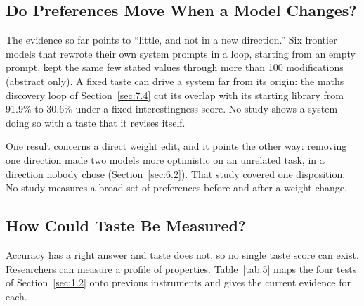 \documentclass[journal]{IEEEtran}
\begin{document}
\subsection{Do Preferences Move When a Model Changes?}\label{sec:8.4}

The evidence so far points to ``little, and not in a new direction.'' Six frontier models that rewrote their own system prompts in a loop, starting from an empty prompt, kept the same few stated values through more than 100 modifications~\cite{Stroganov2026} (abstract only). A fixed taste can drive a system far from its origin: the maths discovery loop of Section~\ref{sec:7.4} cut its overlap with its starting library from 91.9\% to 30.6\% under a fixed interestingness score. No study shows a system doing so with a taste that it revises itself.

One result concerns a direct weight edit, and it points the other way: removing one direction made two models more optimistic on an unrelated task, in a direction nobody chose (Section~\ref{sec:6.2}). That study covered one disposition. No study measures a broad set of preferences before and after a weight change.

\subsection{How Could Taste Be Measured?}\label{sec:8.5}

Accuracy has a right answer and taste does not, so no single taste score can exist. Researchers can measure a profile of properties. Table~\ref{tab:5} maps the four tests of Section~\ref{sec:1.2} onto previous instruments and gives the current evidence for each.
\end{document}
